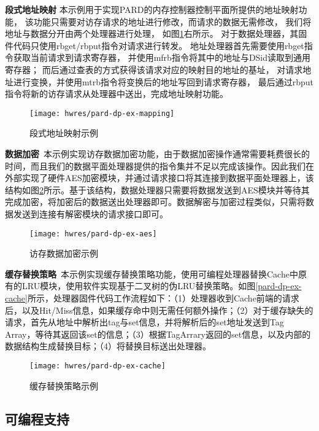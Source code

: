 \textbf{段式地址映射}\quad
本示例用于实现PARD的内存控制器控制平面所提供的地址映射功能，
该功能只需要对访存请求的地址进行修改，而请求的数据无需修改，
我们将地址与数据分开由两个处理器进行处理，
如图\ref{fig:pard-dp-ex-mapping}右所示。
对于数据处理器，其固件代码只使用rbget/rbput指令对请求进行转发。
地址处理器首先需要使用rbget指令获取当前请求到请求寄存器，
并使用mfrb指令将其中的地址与DSid读取到通用寄存器；
而后通过查表的方式获得该请求对应的映射目的地址的基址，
对请求地址进行变换，并使用mtrb指令将变换后的地址写回到请求寄存器，
最后通过rbput指令将新的访存请求从处理器中送出，完成地址映射功能。

\begin{figure}[H]
  \centering
  \texttt{[image: hwres/pard-dp-ex-mapping]}
  \caption{段式地址映射示例}
  \label{fig:pard-dp-ex-mapping}
\end{figure}
 
\textbf{数据加密}\ 本示例实现访存数据加密功能，由于数据加密操作通常需要耗费很长的时间，而且我们的数据平面处理器提供的指令集并不足以完成该操作。因此我们在外部实现了硬件AES加密模块，并通过请求接口将其连接到数据平面处理器上，该结构如图\ref{fig:pard-dp-ex-aes}所示。基于该结构，数据处理器只需要将数据发送到AES模块并等待其完成加密，将加密后的数据送出处理器即可。数据解密与加密过程类似，只需将数据发送到连接有解密模块的请求接口即可。

\begin{figure}[H]
  \centering
  \texttt{[image: hwres/pard-dp-ex-aes]}
  \caption{访存数据加密示例}
  \label{fig:pard-dp-ex-aes}
\end{figure}
 
\textbf{缓存替换策略}\ 本示例实现缓存替换策略功能，使用可编程处理器替换Cache中原有的LRU模块，使用软件实现基于二叉树的伪LRU替换策略。如图\ref{pard-dp-ex-cache}所示，处理器固件代码工作流程如下：（1）处理器收到Cache前端的请求后，以及Hit/Miss信息，如果缓存命中则无需任何额外操作；（2）对于缓存缺失的请求，首先从地址中解析出tag与set信息，并将解析后的set地址发送到Tag Array，等待其返回该set的信息；（3）根据TagArrary返回的set信息，以及内部的数据结构生成替换目标；（4）将替换目标送出处理器。

\begin{figure}[H]
  \centering
  \texttt{[image: hwres/pard-dp-ex-cache]}
  \caption{缓存替换策略示例}
  \label{fig:pard-dp-ex-cache}
\end{figure}


\subsection{可编程支持}


